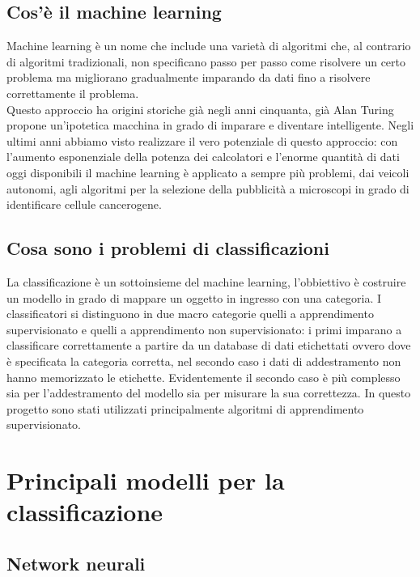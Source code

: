 \documentclass[a4paper,12pt]{report}
\begin{document}
\section{Cos'è il machine learning} %
Machine learning è un nome che include una varietà di algoritmi che, al contrario
di algoritmi tradizionali, non specificano passo per passo come risolvere un
certo problema ma migliorano gradualmente imparando da dati fino a risolvere 
correttamente il problema. \\
Questo approccio ha origini storiche già negli anni cinquanta, già Alan Turing 
propone un'ipotetica macchina in grado di imparare e diventare intelligente. Negli 
ultimi anni abbiamo visto realizzare il vero potenziale di questo approccio:
con l'aumento esponenziale della potenza dei calcolatori e l'enorme quantità di dati
oggi disponibili il machine learning è applicato a sempre più problemi, dai veicoli 
autonomi, agli algoritmi per la selezione della pubblicità a microscopi in grado di 
identificare cellule cancerogene.

\section{Cosa sono i problemi di classificazioni}

La classificazione è un sottoinsieme del machine learning, l'obbiettivo è costruire un 
modello in grado di mappare un oggetto in ingresso con una categoria. I classificatori 
si distinguono in due macro categorie quelli a apprendimento supervisionato e quelli a
apprendimento non supervisionato: i primi imparano a classificare correttamente a 
partire da un database di dati etichettati ovvero dove è specificata la categoria 
corretta, nel secondo caso i dati di addestramento non hanno memorizzato le etichette.
Evidentemente il secondo caso è più complesso sia per l'addestramento del modello sia 
per misurare la sua correttezza. In questo progetto sono stati utilizzati principalmente
algoritmi di apprendimento supervisionato.


\chapter{Principali modelli per la classificazione}
\section{Network neurali}
\end{document}
